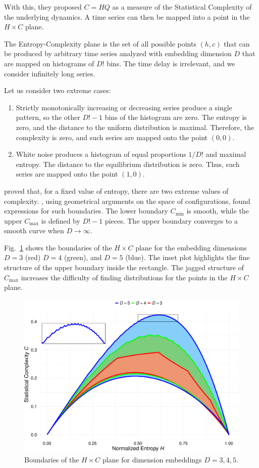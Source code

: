 \documentclass[12pt]{article}
\begin{document}
With this, they proposed $C=HQ$ as a measure of the Statistical Complexity of the underlying dynamics.
A time series can then be mapped into a point in the $H\times C$ plane.

The Entropy-Complexity plane is the set of all possible points $(h,c)$ that can be produced by arbitrary time series analyzed with embedding dimension $D$ that are mapped on histograms of $D!$ bins.
The time delay is irrelevant, and we consider infinitely long series.

Let us consider two extreme cases:
\begin{enumerate}[label=Case~\Roman*., align=left, leftmargin=*]
	\item 	Strictly monotonically increasing or decreasing series produce a single pattern, so the other $D!-1$ bins of the histogram are zero. 
	The entropy is zero, and the distance to the uniform distribution is maximal. 
	Therefore, the complexity is zero, and such series are mapped onto the point $(0,0)$.
	\item 	White noise produces a histogram of equal proportions $1/D!$ and maximal entropy. 
	The distance to the equilibrium distribution is zero. 
	Thus, such series are mapped onto the point $(1,0)$.
\end{enumerate}

\citet{SomeFeaturesoftheLMCStatisticalComplexity} proved that, for a fixed value of entropy, there are two extreme values of complexity.
\citet{martin2006generalized}, using geometrical arguments on the space of configurations, found expressions for such boundaries.
The lower boundary $C_{\min}$ is smooth, while the upper $C_{\max}$ is defined by $D!-1$ pieces.
The upper boundary converges to a smooth curve when $D\to\infty$.


Fig.~\ref{fig:Boundaries} shows the boundaries of the $H\times C$ plane for the embedding dimensions $D=3$ (red) $D=4$ (green), and $D=5$ (blue).
The inset plot highlights the fine structure of the upper boundary inside the rectangle.
The jagged structure of $C_{\max}$ increases the difficulty of finding distributions for the points in the $H\times C$ plane.

\begin{figure}[hbt]
	\centering
	\includegraphics[width=.7\linewidth]{Figures/BoundariesPlot}
	\caption{Boundaries of the $H\times C$ plane for dimension embeddings $D=3,4,5$.}\label{fig:Boundaries}
\end{figure}
\end{document}
